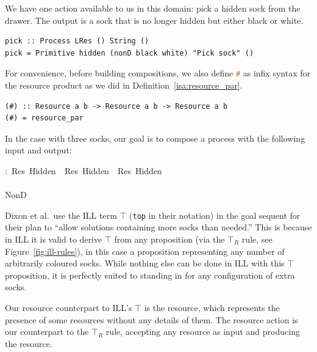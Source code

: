 \documentclass[class=smolathesis,crop=false]{standalone}
\begin{document}
We have one action available to us in this domain: pick a hidden sock from the drawer.
The output is a sock that is no longer hidden but either black or white.
\begin{lstlisting}[label=lst:socks-pick,caption=Primitive action for picking a sock,basicstyle=\footnotesize\ttfamily,columns=flexible,breaklines=true,showstringspaces=false]
pick :: Process LRes () String ()
pick = Primitive hidden (nonD black white) "Pick sock" ()
\end{lstlisting}

For convenience, before building compositions, we also define \lstinline[language=haskell]{#} as infix syntax for the resource product as we did \isa{\isasymodot} in Definition~\ref{isa:resource_par}.
\begin{lstlisting}[label=lst:socks-resource_par,caption=Infix syntax for resource product,basicstyle=\small\ttfamily,columns=flexible,breaklines=true]
(#) :: Resource a b -> Resource a b -> Resource a b
(#) = resource_par
\end{lstlisting}
\cbend

In the case with three socks, our goal is to compose a process  with the following input and output:
\begin{isabelle}
\centering
  :\ Res\ Hidden\ \isasymodot\ Res\ Hidden\ \isasymodot\ Res\ Hidden\\
  \isasymrightarrow\\
  NonD\ \ 
\end{isabelle}

Dixon et al.\ use the ILL term $\top$ (\texttt{top} in their notation) in the goal sequent for their plan to ``allow solutions containing more socks than needed.''
This is because in ILL it is valid to derive $\top$ from any proposition (via the ${\top}_R$ rule, see Figure~\ref{fig:ill-rules}), in this case a proposition representing any number of arbitrarily coloured socks.
While nothing else can be done in ILL with this $\top$ proposition, it is perfectly suited to standing in for any configuration of extra socks.

Our resource counterpart to ILL's $\top$ is the  resource, which represents the presence of some resources without any details of them.
The resource action  is our counterpart to the ${\top}_R$ rule, accepting any resource as input and producing the  resource.
\end{document}
